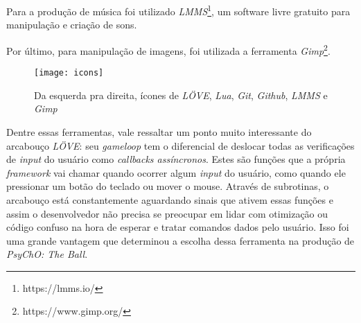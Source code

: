 Para a produção de música foi utilizado \textit{LMMS}\footnote{https://lmms.io/}, um software livre gratuito para manipulação e criação de sons.

Por último, para manipulação de imagens, foi utilizada a ferramenta \textit{Gimp}\footnote{https://www.gimp.org/}.

\begin{figure}[h!]
\texttt{[image: icons]}
\centering
\caption{Da esquerda pra direita, ícones de \textit{LÖVE}, \textit{Lua}, \textit{Git}, \textit{Github}, \textit{LMMS} e \textit{Gimp}}
\end{figure}

Dentre essas ferramentas, vale ressaltar um ponto muito interessante do arcabouço \textit{LÖVE}: seu \textit{gameloop} tem o diferencial de deslocar todas as verificações de \textit{input} do usuário como \textit{callbacks assíncronos}. Estes são funções que a própria \textit{framework} vai chamar quando ocorrer algum \textit{input} do usuário, como quando ele pressionar um botão do teclado ou mover o mouse. Através de subrotinas, o arcabouço está constantemente aguardando sinais que ativem essas funções e assim o desenvolvedor não precisa se preocupar em lidar com otimização ou código confuso na hora de esperar e tratar comandos dados pelo usuário. Isso foi uma grande vantagem que determinou a escolha dessa ferramenta na produção de \textit{PsyChO: The Ball}.

